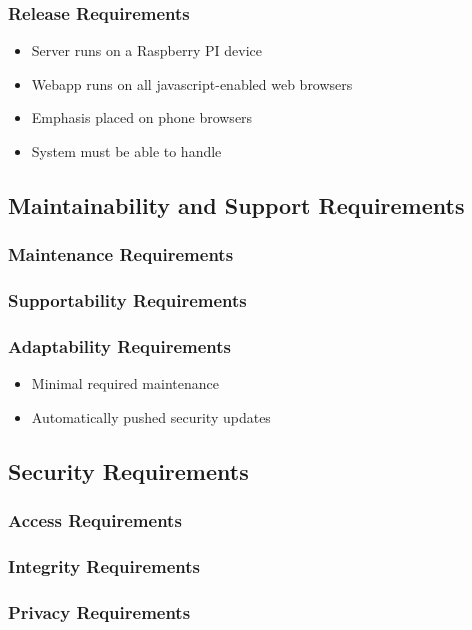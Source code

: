 \documentclass[12pt, titlepage]{article}
\begin{document}
\subsubsection{Release Requirements}

\begin{itemize}
\item Server runs on a Raspberry PI device
\item Webapp runs on all javascript-enabled web browsers
\item Emphasis placed on phone browsers
\item System must be able to handle
\end{itemize}

\subsection{Maintainability and Support Requirements}
\subsubsection{Maintenance Requirements}
\subsubsection{Supportability Requirements}
\subsubsection{Adaptability Requirements}
\begin{itemize}
\item Minimal required maintenance
\item Automatically pushed security updates
\end{itemize}

\subsection{Security Requirements}
\subsubsection{Access Requirements}
\subsubsection{Integrity Requirements}
\subsubsection{Privacy Requirements}
\end{document}

